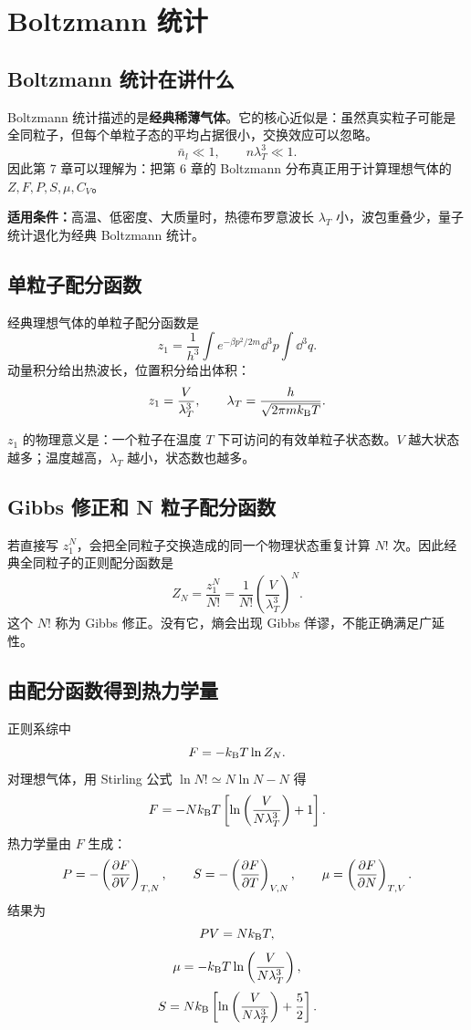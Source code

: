 \chapter{Boltzmann 统计}

\section{Boltzmann 统计在讲什么}

Boltzmann 统计描述的是\textbf{经典稀薄气体}。它的核心近似是：虽然真实粒子可能是全同粒子，但每个单粒子态的平均占据很小，交换效应可以忽略。
\[
  \bar n_l\ll 1,\qquad n\lambda_T^3\ll 1.
\]
因此第 7 章可以理解为：把第 6 章的 Boltzmann 分布真正用于计算理想气体的 $Z,F,P,S,\mu,C_V$。

\begin{keybox}
\textbf{适用条件：}高温、低密度、大质量时，热德布罗意波长 $\lambda_T$ 小，波包重叠少，量子统计退化为经典 Boltzmann 统计。
\end{keybox}

\section{单粒子配分函数}

经典理想气体的单粒子配分函数是
\[
  z_1
  =\frac{1}{h^3}\int e^{-\beta p^2/2m}\dd^3p
  \int\dd^3q.
\]
动量积分给出热波长，位置积分给出体积：
\[
  z_1=\frac{V}{\lambda_T^3},
\qquad
  \lambda_T=\frac{h}{\sqrt{2\pi mk_{\mathrm B} T}}.
\]

$z_1$ 的物理意义是：一个粒子在温度 $T$ 下可访问的有效单粒子状态数。$V$ 越大状态越多；温度越高，$\lambda_T$ 越小，状态数也越多。

\section{Gibbs 修正和 N 粒子配分函数}

若直接写 $z_1^N$，会把全同粒子交换造成的同一个物理状态重复计算 $N!$ 次。因此经典全同粒子的正则配分函数是
\[
  Z_N=\frac{z_1^N}{N!}
  =\frac{1}{N!}
  \left(\frac{V}{\lambda_T^3}\right)^N.
\]
这个 $N!$ 称为 Gibbs 修正。没有它，熵会出现 Gibbs 佯谬，不能正确满足广延性。

\section{由配分函数得到热力学量}

正则系综中
\[
  F=-k_{\mathrm B} T\ln Z_N.
\]
对理想气体，用 Stirling 公式 $\ln N!\simeq N\ln N-N$ 得
\[
  F=-Nk_{\mathrm B} T
  \left[
    \ln\left(\frac{V}{N\lambda_T^3}\right)+1
  \right].
\]
热力学量由 $F$ 生成：
\[
  P=-\left(\frac{\partial F}{\partial V}\right)_{T,N},\qquad
  S=-\left(\frac{\partial F}{\partial T}\right)_{V,N},\qquad
  \mu=\left(\frac{\partial F}{\partial N}\right)_{T,V}.
\]
结果为
\[
  PV=Nk_{\mathrm B} T,
\]
\[
  \mu=-k_{\mathrm B} T\ln\left(\frac{V}{N\lambda_T^3}\right),
\]
\[
  S=Nk_{\mathrm B}
  \left[
    \ln\left(\frac{V}{N\lambda_T^3}\right)+\frac{5}{2}
  \right].
\]

